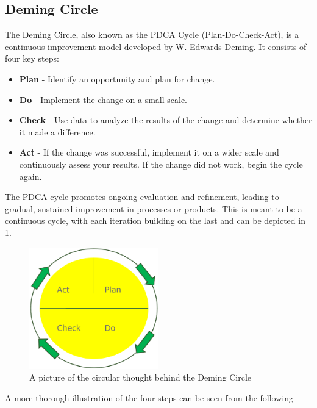 \subsection{Deming Circle}
The Deming Circle, also known as the PDCA Cycle (Plan-Do-Check-Act), is a continuous improvement model developed by W. Edwards Deming. It consists of four key steps:

\begin{highlight}
    \begin{itemize}
        \item \textbf{Plan} - Identify an opportunity and plan for change.
        \item \textbf{Do} - Implement the change on a small scale.
        \item \textbf{Check} - Use data to analyze the results of the change and determine whether it made a difference.
        \item \textbf{Act} - If the change was successful, implement it on a wider scale and continuously assess your results. If the change did not work, begin the cycle again.
    \end{itemize}
\end{highlight}

The PDCA cycle promotes ongoing evaluation and refinement, leading to gradual, sustained improvement in processes or products. This is meant to be a continuous cycle, with each iteration building on the last and can be depicted in \ref{fig:demingcircle}.

\begin{figure}[h]
    \centering
    \includegraphics[width=0.5\textwidth]{Figures/DemingCircle.png}
    \caption{A picture of the circular thought behind the Deming Circle}
    \label{fig:demingcircle}
\end{figure}

A more thorough illustration of the four steps can be seen from the following 

